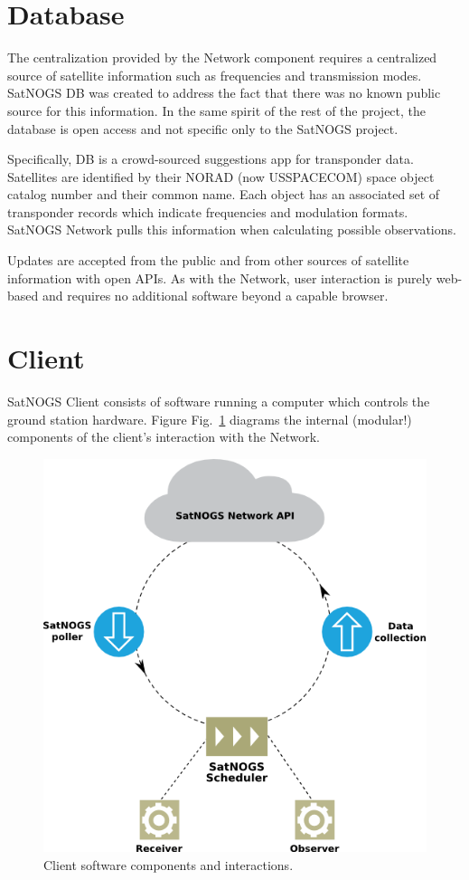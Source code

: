 \documentclass[conference,letterpaper,12pt]{IEEEtran}
\newcommand{\figref}[1]{Fig.~\ref{#1}}
\newlength{\imgwidth}
\begin{document}
\section{Database}
The centralization provided by the Network component requires a centralized source of satellite information such as frequencies and transmission modes.
SatNOGS DB was created to address the fact that there was no known public source for this information.
In the same spirit of the rest of the project, the database is open access and not specific only to the SatNOGS project.

Specifically, DB is a crowd-sourced suggestions app for transponder data.
Satellites are identified by their NORAD (now USSPACECOM) space object catalog number and their common name.
Each object has an associated set of transponder records which indicate frequencies and modulation formats.
SatNOGS Network pulls this information when calculating possible observations.

Updates are accepted from the public and from other sources of satellite information with open APIs.
As with the Network, user interaction is purely web-based and requires no additional software beyond a capable browser.


\section{Client}
SatNOGS Client consists of software running a computer which controls the ground station hardware.
Figure \figref{f:client-flow} diagrams the internal (modular!) components of the client's interaction with the Network.

\begin{figure}[htbp]
\centering
\includegraphics[width=\imgwidth]{fig/client-flow}
\caption{Client software components and interactions.}
\label{f:client-flow}
\end{figure}
\end{document}
